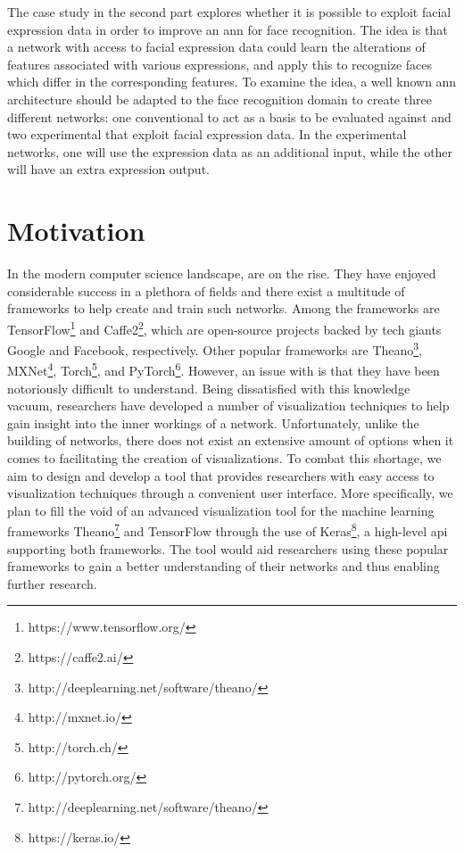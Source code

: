 \noindent The case study in the second part explores whether it is possible to exploit facial expression data in order to improve an \acrshort{ann} for face recognition. The idea is that a network with access to facial expression data could learn the alterations of features associated with various expressions, and apply this to recognize faces which differ in the corresponding features. To examine the idea, a well known \acrshort{ann} architecture should be adapted to the face recognition domain to create three different networks: one conventional to act as a basis to be evaluated against and two experimental that exploit facial expression data. In the experimental networks, one will use the expression data as an additional input, while the other will have an extra expression output. \\

\section{Motivation}

\noindent In the modern computer science landscape,  are on the rise. They have enjoyed considerable success in a plethora of fields and there exist a multitude of frameworks to help create and train such networks. Among the frameworks are TensorFlow\footnote{https://www.tensorflow.org/} and Caffe2\footnote{https://caffe2.ai/}, which are open-source projects backed by tech giants Google and Facebook, respectively. Other popular frameworks are Theano\footnote{http://deeplearning.net/software/theano/}, MXNet\footnote{http://mxnet.io/}, Torch\footnote{http://torch.ch/}, and PyTorch\footnote{http://pytorch.org/}. However, an issue with  is that they have been notoriously difficult to understand. Being dissatisfied with this knowledge vacuum, researchers have developed a number of visualization techniques to help gain insight into the inner workings of a network. Unfortunately, unlike the building of networks, there does not exist an extensive amount of options when it comes to facilitating the creation of visualizations. To combat this shortage, we aim to design and develop a tool that provides researchers with easy access to visualization techniques through a convenient user interface. More specifically, we plan to fill the void of an advanced visualization tool for the machine learning frameworks Theano\footnote{http://deeplearning.net/software/theano/} and TensorFlow through the use of Keras\footnote{https://keras.io/}, a high-level \acrfull{api} supporting both frameworks. The tool would aid researchers using these popular frameworks to gain a better understanding of their networks and thus enabling further research. \\

